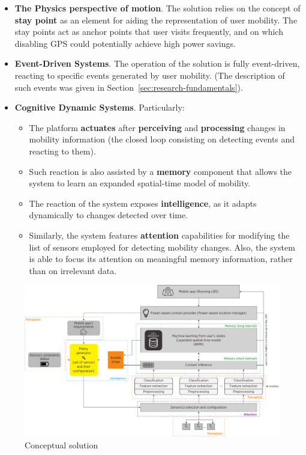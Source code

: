 \documentclass[ENG,PhD]{cinvestav}
\begin{document}
\begin{itemize}
  \item \textbf{The Physics perspective of motion}.
  The solution relies on the concept of \textbf{stay point} as an element for aiding the representation of user mobility.
  The stay points act as anchor points that user visits frequently, and on which disabling GPS could potentially achieve high power savings. 

  \item \textbf{Event-Driven Systems}. The operation of the solution is fully event-driven, reacting to specific events generated by user mobility.
  (The description of such events was given in Section~\ref{sec:research-fundamentals}).
  
  \item \textbf{Cognitive Dynamic Systems}. Particularly:
  \begin{itemize}
    \item The platform \textbf{actuates} after \textbf{perceiving} and \textbf{processing} changes in mobility information (the closed loop consisting on detecting events and reacting to them).
    \item Such reaction is also assisted by a \textbf{memory} component that allows the system to learn an expanded spatial-time model of mobility.
    \item The reaction of the system exposes \textbf{intelligence}, as it adapts dynamically to changes detected over time.
    \item Similarly, the system features \textbf{attention} capabilities for modifying the list of sensors employed for detecting mobility changes.
    Also, the system is able to focus its attention on meaningful memory information, rather than on irrelevant data.
  \end{itemize}
\end{itemize}

\begin{landscape}
\begin{figure}
  \centering
  \includegraphics[width=\linewidth]{vectors/solution-general-overview}
  \caption{Conceptual solution}
  \label{fig:overall-architecture-of-proposed-system}
\end{figure}
\end{landscape}
\end{document}
